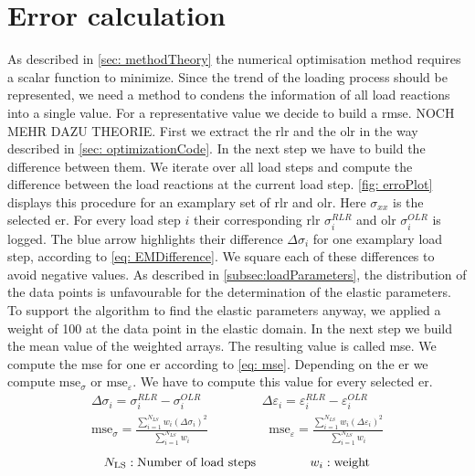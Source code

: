\section{Error calculation}\label{sec: errorCalculation}
As described in \autoref{sec: methodTheory} the numerical optimisation method requires a scalar function to minimize. 
Since the trend of the loading process should be represented, we need a method to condens the information of all load reactions into a single value.  For a representative value we decide to build a \acrfull{rmse}. NOCH MEHR DAZU THEORIE.
First we extract the \acrlong{rlr} and the \acrlong{olr} in the way described in \autoref{sec: optimizationCode}. In the next step we have to build the difference between them. We iterate over all load steps and compute the difference between the load reactions at the current load step. \autoref{fig: erroPlot} displays this procedure for an examplary set of \acrlong{rlr} and \acrshort{olr}. Here $\sigma_{xx}$ is the selected \acrlong{er}. For every load step $i$ their corresponding \acrfull{rlr} $\sigma_{i}^{\scriptscriptstyle RLR}$ and \acrfull{olr} $\sigma_{i}^{\scriptscriptstyle OLR}$ is logged. The blue arrow highlights their difference $\Delta\sigma_{i}$ for one examplary load step, according to \autoref{eq: EMDifference}. We square each of these differences to avoid negative values.  As described in \autoref{subsec:loadParameters}, the distribution of the data points is unfavourable for the determination of the elastic parameters. To support the algorithm to find the elastic parameters anyway, we applied a weight of 100 at the data point in the elastic domain. In the next step we build the mean value of the weighted arrays. The resulting value is called \acrfull{mse}. We compute the \acrshort{mse} for one \acrlong{er} according to \autoref{eq: mse}. Depending on the \acrlong{er} we compute $\text{mse}_{\sigma}$ or $\text{mse}_{\varepsilon}$. We have to compute this value for every selected \acrlong{er}. 
\begin{gather}
    \label{eq: EMDifference}
    \Delta\sigma_{i} = \sigma_{i}^{\scriptscriptstyle RLR} - \sigma_{i}^{\scriptscriptstyle OLR} \hspace{2cm}
    \Delta\varepsilon_{i} = \varepsilon_{i}^{\scriptscriptstyle RLR} - \varepsilon_{i}^{\scriptscriptstyle OLR}\\
    \label{eq: mse}
    \text{mse}_{\sigma} = \frac{\displaystyle\sum_{i=1}^{N_{LS}} w_i (\Delta\sigma_{i})^2}{\displaystyle\sum_{i=1}^{N_{LS}}w_i } \hspace{2cm}
    \text{mse}_{\varepsilon} = \frac{\displaystyle\sum_{i=1}^{N_{LS}} w_i (\Delta\varepsilon_{i})^2}{\displaystyle\sum_{i=1}^{N_{LS}}w_i }
\end{gather}
\begin{equation*}
    N_{\text{LS}}: \text{Number of load steps}
    \hspace{1.5cm}
    w_i : \text{weight}
\end{equation*}




